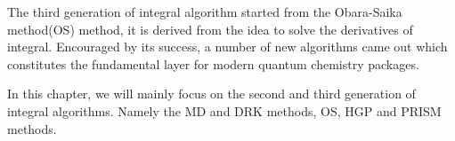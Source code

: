 The third generation of integral algorithm started from the Obara-Saika method(OS)\cite{OS1986,
OS1988} method, it is derived from the idea to solve the derivatives of integral\cite{HB1982,HB1989}. 
Encouraged by its success, a number of new algorithms came out\cite{HGP,gill1989efficient,
gill1990efficient,PRISM,coldprism} which constitutes the fundamental
layer for modern quantum chemistry packages. 

In this chapter, we will mainly focus on the second and third generation of integral algorithms. 
Namely the MD and DRK methods, OS, HGP and PRISM methods.






